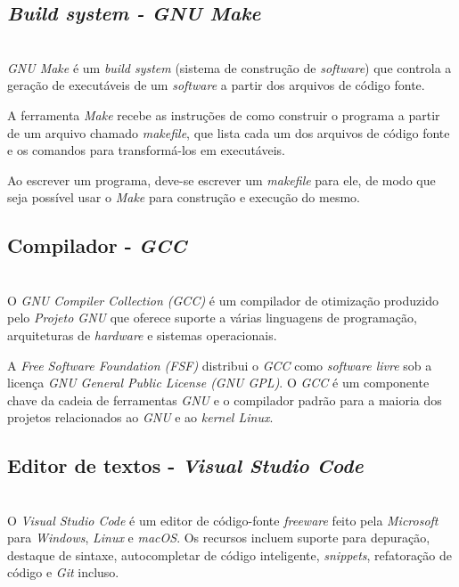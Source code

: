 \documentclass[times, twoside, watermark]{artigo}
\begin{document}
\subsection{\textit{Build system - GNU Make}}\hfill\\

\textit{GNU Make} é um \textit{build system} (sistema de construção de
\textit{software}) que controla a geração de executáveis de um \textit{software}
a partir dos arquivos de código fonte.

A ferramenta \textit{Make} recebe as instruções de como construir o programa a partir
de um arquivo chamado \textit{makefile}, que lista cada um dos arquivos de código
fonte e os comandos para transformá-los em executáveis.

Ao escrever um programa, deve-se escrever um \textit{makefile} para ele, de modo
que seja possível usar o \textit{Make} para construção e execução do mesmo.
\cite{gnumake}

\subsection{Compilador - \textit{GCC}}\hfill\\

O \textit{GNU Compiler Collection (GCC)} é um compilador de otimização produzido pelo
\textit{Projeto GNU} que oferece suporte a várias linguagens de programação,
arquiteturas de \textit{hardware} e sistemas operacionais.

A \textit{Free Software Foundation (FSF)} distribui o \textit{GCC} como
\textit{software livre} sob a licença \textit{GNU General Public License (GNU GPL)}.
O \textit{GCC} é um componente chave da cadeia de ferramentas \textit{GNU} e o
compilador padrão para a maioria dos projetos relacionados ao \textit{GNU} e ao
\textit{kernel Linux}.\cite{gcc}


\subsection{Editor de textos - \textit{Visual Studio Code}}\hfill\\

O \textit{Visual Studio Code} é um editor de código-fonte \textit{freeware} feito
pela \textit{Microsoft} para \textit{Windows}, \textit{Linux} e \textit{macOS}. Os
recursos incluem suporte para depuração, destaque de sintaxe, autocompletar de código
inteligente, \textit{snippets}, refatoração de código e \textit{Git}
incluso.\cite{vscode}
\end{document}
